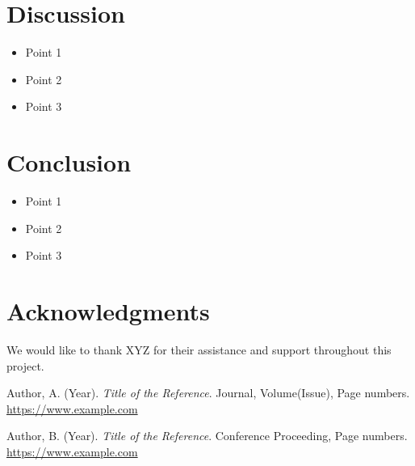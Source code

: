 \documentclass{article}
\begin{document}
\lipsum[3] %

\section{Discussion}
\begin{keypoints}
\begin{itemize}
  \item Point 1
  \item Point 2
  \item Point 3
\end{itemize}
\end{keypoints}

\lipsum[4] %

\section{Conclusion}
\begin{keypoints}
\begin{itemize}
  \item Point 1
  \item Point 2
  \item Point 3
\end{itemize}
\end{keypoints}

\lipsum[5] %

\section*{Acknowledgments} %
We would like to thank XYZ for their assistance and support throughout this project.

\begin{thebibliography}{9}
Author, A. (Year). \textit{Title of the Reference}. Journal, Volume(Issue), Page numbers. \url{https://www.example.com}

Author, B. (Year). \textit{Title of the Reference}. Conference Proceeding, Page numbers. \url{https://www.example.com}
\end{thebibliography}
\end{document}
